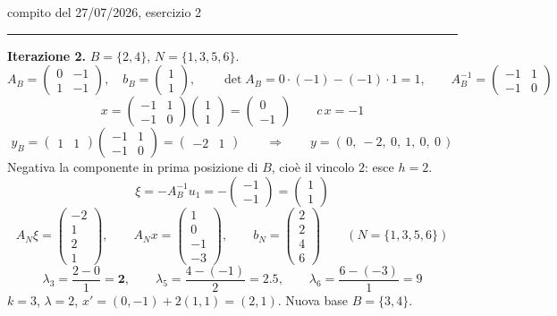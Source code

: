 \documentclass[11pt,a4paper]{article}
\begin{document}
\begin{es}{compito del 27/07/2026, esercizio 2}
\medskip
\hrule
\medskip

\textbf{Iterazione 2.} \quad $B=\{2,4\}$, $N=\{1,3,5,6\}$.
\[
A_B = \begin{pmatrix} 0 & -1\\ 1 & -1\end{pmatrix},\quad
b_B = \begin{pmatrix}1\\1\end{pmatrix},
\qquad \det A_B = 0\cdot(-1) - (-1)\cdot 1 = 1,
\qquad
A_B^{-1} = \begin{pmatrix} -1 & 1\\ -1 & 0\end{pmatrix}
\]
\[
x = \begin{pmatrix}-1&1\\-1&0\end{pmatrix}\begin{pmatrix}1\\1\end{pmatrix} = \begin{pmatrix}0\\-1\end{pmatrix}
\qquad c\,x = -1
\]
\[
y_B = \begin{pmatrix}1&1\end{pmatrix}\begin{pmatrix}-1&1\\-1&0\end{pmatrix} = \begin{pmatrix}-2 & 1\end{pmatrix}
\qquad\Longrightarrow\qquad y = (\,0,\ -2,\ 0,\ 1,\ 0,\ 0\,)
\]
Negativa la componente in prima posizione di $B$, cioè il vincolo $2$: esce $h = 2$.
\[
\xi = -A_B^{-1}u_1 = -\begin{pmatrix}-1\\-1\end{pmatrix} = \begin{pmatrix}1\\1\end{pmatrix}
\]
\[
A_N\xi = \begin{pmatrix}-2\\1\\2\\1\end{pmatrix},\qquad
A_N x = \begin{pmatrix}1\\0\\-1\\-3\end{pmatrix},\qquad
b_N = \begin{pmatrix}2\\2\\4\\6\end{pmatrix}
\qquad (N = \{1,3,5,6\})
\]
\[
\lambda_3 = \frac{2-0}{1} = \mathbf{2},\qquad
\lambda_5 = \frac{4-(-1)}{2} = 2.5,\qquad
\lambda_6 = \frac{6-(-3)}{1} = 9
\]
$k = 3$, $\lambda = 2$, $x' = (0,-1) + 2(1,1) = (2,1)$. Nuova base $B=\{3,4\}$.


\end{es}
\end{document}
